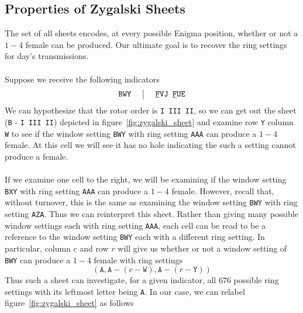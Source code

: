 \subsection{Properties of Zygalski Sheets}
The set of all sheets encodes, at every possible Enigma position, whether or not a $1-4$ female can be produced. Our ultimate goal is to recover the ring settings for day's transmissions.
\\\\Suppose we receive the following indicators
\[
	\setlength{\arraycolsep}{15pt}
	\begin{array}{c | c}
		\texttt{BWY} & {\uline{\texttt{F}}}\texttt{VJ }{\uline{\texttt{F}}}\texttt{UE} \\
	\end{array}
\]
We can hypothesize that the rotor order is \texttt{I III II}, so we can get out the sheet (\texttt{B} - \texttt{I III II}) depicted in figure~\ref{fig:zygalski_sheet} and examine row \texttt{Y} column \texttt{W} to see if the window setting \texttt{BWY} with ring setting \texttt{AAA} can produce a $1-4$ female. At this cell we will see it has no hole indicating the such a setting cannot produce a female.
\\\\If we examine one cell to the right, we will be examining if the window setting \texttt{BXY} with ring setting \texttt{AAA} can produce a $1-4$ female. However, recall that, without turnover, this is the same as examining the window setting \texttt{BWY} with ring setting \texttt{AZA}. Thus we can reinterpret this sheet. Rather than giving many possible window settings each with ring setting \texttt{AAA}, each cell can be read to be a reference to the window setting \texttt{BWY} each with a different ring setting. In particular, column $c$ and row $r$ will give us whether or not a window setting of \texttt{BWY} can produce a $1-4$ female with ring settings
\[
	(\texttt{A}, \texttt{A} - (c -\texttt{W}), \texttt{A} - (r -\texttt{Y}))
\]
Thus such a sheet can investigate, for a given indicator, all $676$ possible ring settings with its leftmost letter being \texttt{A}. In our case, we can relabel figure~\ref{fig:zygalski_sheet} as follows
